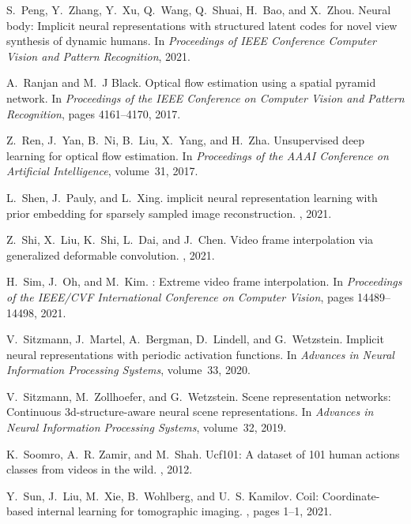 \documentclass[12pt]{article}
\begin{document}
\begin{thebibliography}{10}
S.~Peng, Y.~Zhang, Y.~Xu, Q.~Wang, Q.~Shuai, H.~Bao, and X.~Zhou.
\newblock Neural body: Implicit neural representations with structured latent
  codes for novel view synthesis of dynamic humans.
\newblock In {\em Proceedings of {IEEE} Conference Computer Vision and Pattern
  Recognition}, 2021.

A.~Ranjan and M.~J Black.
\newblock Optical flow estimation using a spatial pyramid network.
\newblock In {\em Proceedings of the IEEE Conference on Computer Vision and
  Pattern Recognition}, pages 4161--4170, 2017.

Z.~Ren, J.~Yan, B.~Ni, B.~Liu, X.~Yang, and H.~Zha.
\newblock Unsupervised deep learning for optical flow estimation.
\newblock In {\em Proceedings of the AAAI Conference on Artificial
  Intelligence}, volume~31, 2017.

L.~Shen, J.~Pauly, and L.~Xing.
 implicit neural representation learning with prior embedding
  for sparsely sampled image reconstruction.
, 2021.

Z.~Shi, X.~Liu, K.~Shi, L.~Dai, and J.~Chen.
\newblock Video frame interpolation via generalized deformable convolution.
, 2021.

H.~Sim, J.~Oh, and M.~Kim.
: Extreme video frame interpolation.
\newblock In {\em Proceedings of the IEEE/CVF International Conference on
  Computer Vision}, pages 14489--14498, 2021.

V.~Sitzmann, J.~Martel, A.~Bergman, D.~Lindell, and G.~Wetzstein.
\newblock Implicit neural representations with periodic activation functions.
\newblock In {\em Advances in Neural Information Processing Systems},
  volume~33, 2020.

V.~Sitzmann, M.~Zollhoefer, and G.~Wetzstein.
\newblock Scene representation networks: Continuous 3d-structure-aware neural
  scene representations.
\newblock In {\em Advances in Neural Information Processing Systems},
  volume~32, 2019.

K.~Soomro, A.~R. Zamir, and M.~Shah.
\newblock Ucf101: A dataset of 101 human actions classes from videos in the
  wild.
, 2012.

Y.~Sun, J.~Liu, M.~Xie, B.~Wohlberg, and U.~S. Kamilov.
\newblock Coil: Coordinate-based internal learning for tomographic imaging.
, pages 1--1, 2021.


\end{thebibliography}
\end{document}
